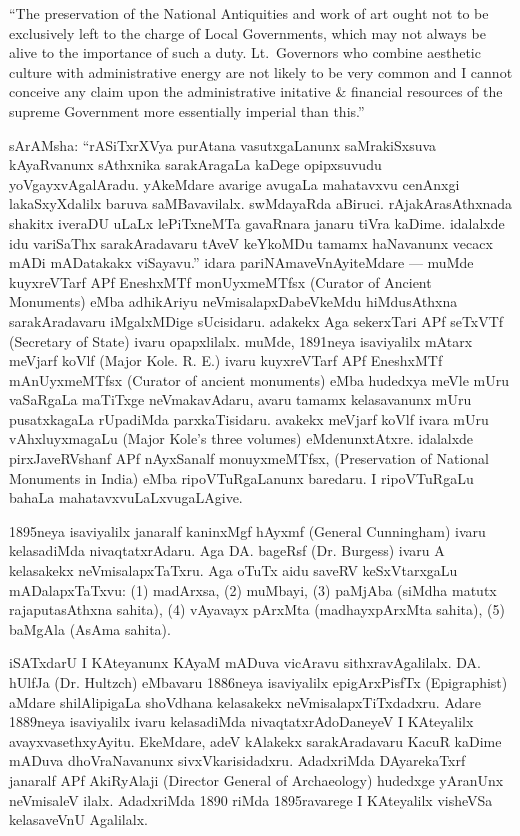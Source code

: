 \documentclass[11pt,a4size]{article}
\begin{document}
{
\rm
``The preservation of the National Antiquities and work of art ought
not to be exclusively left to the charge of Local Governments, which
may not always be alive to the importance of such a duty.
Lt.~Governors who combine aesthetic culture with administrative
energy are not likely to be very common and I cannot conceive any
claim upon the administrative initative \& financial resources of the
supreme Government more essentially imperial than this.''}

sArAMsha: ``rASiTxrXVya purAtana vasutxgaLanunx saMrakiSxsuva
kAyaRvanunx sAthxnika sarakAragaLa kaDege opipxsuvudu
yoVgayxvAgalAradu. yAkeMdare avarige avugaLa mahatavxvu cenAnxgi
lakaSxyXdalilx baruva saMBavavilalx. swMdayaRda
aBiruci. rAjakArasAthxnada shakitx iveraDU uLaLx lePiTxneMTa gavaRnara
janaru tiVra kaDime. idalalxde idu variSaThx sarakAradavaru tAveV
keYkoMDu tamamx haNavanunx vecacx mADi mADatakakx viSayavu.'' idara
pariNAmaveVnAyiteMdare --- muMde kuyxreVTarf APf EneshxMTf
monUyxmeMTfsx {\rm (Curator of Ancient Monuments)} eMba
adhikAriyu neVmisalapxDabeVkeMdu hiMdusAthxna sarakAradavaru
iMgalxMDige sUcisidaru. adakekx Aga sekerxTari APf seTxVTf
{\rm (Secretary of State)} ivaru opapxlilalx. muMde,
1891neya isaviyalilx mAtarx meVjarf koVlf {\rm (Major
    Kole. R. E.)} ivaru kuyxreVTarf APf EneshxMTf mAnUyxmeMTfsx
{\rm (Curator of ancient monuments)} eMba hudedxya
meVle mUru vaSaRgaLa maTiTxge neVmakavAdaru, avaru tamamx kelasavanunx
mUru pusatxkagaLa rUpadiMda parxkaTisidaru. avakekx meVjarf koVlf
ivara mUru vAhxluyxmagaLu {\rm (Major Kole's three
    volumes)} eMdenunxtAtxre. idalalxde pirxJaveRVshanf APf
nAyxSanalf monuyxmeMTfsx, {\rm (Preservation of National
    Monuments in India)} eMba ripoVTuRgaLanunx baredaru. I
ripoVTuRgaLu bahaLa mahatavxvuLaLxvugaLAgive.

1895neya isaviyalilx janaralf kaninxMgf hAyxmf {\rm
    (General Cunningham)} ivaru kelasadiMda nivaqtatxrAdaru. Aga
    DA. bageRsf {\rm (Dr. Burgess)} ivaru A kelasakekx
    neVmisalapxTaTxru. Aga oTuTx aidu saveRV keSxVtarxgaLu
    mADalapxTaTxvu: (1) madArxsa, (2) muMbayi, (3) paMjAba (siMdha
    matutx rajaputasAthxna sahita), (4) vAyavayx pArxMta
    (madhayxpArxMta sahita), (5) baMgAla (AsAma sahita).

iSATxdarU I KAteyanunx KAyaM mADuva vicAravu
sithxravAgalilalx. DA. hUlfJa {\rm (Dr. Hultzch)}
eMbavaru 1886neya isaviyalilx epigArxPisfTx
{\rm(Epigraphist)} aMdare shilAlipigaLa shoVdhana
kelasakekx neVmisalapxTiTxdadxru. Adare 1889neya isaviyalilx ivaru
kelasadiMda nivaqtatxrAdoDaneyeV I KAteyalilx
avayxvasethxyAyitu. EkeMdare, adeV kAlakekx sarakAradavaru KacuR
kaDime mADuva dhoVraNavanunx sivxVkarisidadxru. AdadxriMda
DAyarekaTxrf janaralf APf AkiRyAlaji {\rm(Director
    General of Archaeology)} hudedxge yAranUnx neVmisaleV
ilalx. AdadxriMda 1890 riMda 1895ravarege I KAteyalilx visheVSa
kelasaveVnU Agalilalx.
\end{document}
